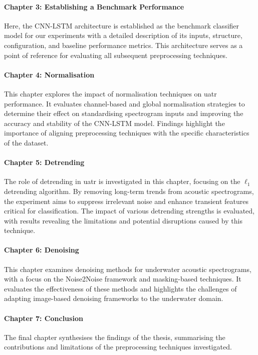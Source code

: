 \paragraph{Chapter 3: Establishing a Benchmark Performance} Here, the CNN-LSTM architecture is established as the benchmark classifier model for our experiments with a detailed description of its inputs, structure, configuration, and baseline performance metrics. This architecture serves as a point of reference for evaluating all subsequent preprocessing techniques.

\paragraph{Chapter 4: Normalisation}
This chapter explores the impact of normalisation techniques on \acrshort{uatr} performance. It evaluates channel-based and global normalisation strategies to determine their effect on standardising spectrogram inputs and improving the accuracy and stability of the CNN-LSTM model. Findings highlight the importance of aligning preprocessing techniques with the specific characteristics of the dataset.

\paragraph{Chapter 5: Detrending} 
The role of detrending in \acrshort{uatr} is investigated in this chapter, focusing on the $\ell_1$ detrending algorithm. By removing long-term trends from acoustic spectrograms, the experiment aims to suppress irrelevant noise and enhance transient features critical for classification. The impact of various detrending strengths is evaluated, with results revealing the limitations and potential disruptions caused by this technique.

\paragraph{Chapter 6: Denoising}
This chapter examines denoising methods for underwater acoustic spectrograms, with a focus on the Noise2Noise framework and masking-based techniques. It evaluates the effectiveness of these methods and highlights the challenges of adapting image-based denoising frameworks to the underwater domain.

\paragraph{Chapter 7: Conclusion}
The final chapter synthesises the findings of the thesis, summarising the contributions and limitations of the preprocessing techniques investigated.